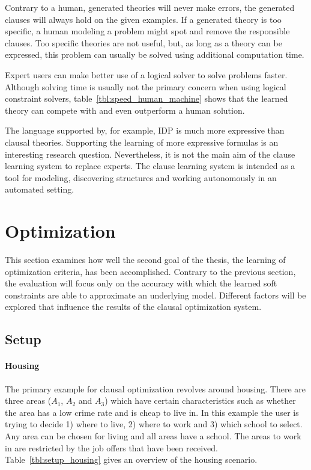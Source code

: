 Contrary to a human, generated theories will never make errors, the generated clauses will always hold on the given examples.
If a generated theory is too specific, a human modeling a problem might spot and remove the responsible clauses.
Too specific theories are not useful, but, as long as a theory can be expressed, this problem can usually be solved using additional computation time.

Expert users can make better use of a logical solver to solve problems faster.
Although solving time is usually not the primary concern when using logical constraint solvers, table~\ref{tbl:speed_human_machine} shows that the learned theory can compete with and even outperform a human solution.

The language supported by, for example, IDP is much more expressive than clausal theories.
Supporting the learning of more expressive formulas is an interesting research question.
Nevertheless, it is not the main aim of the clause learning system to replace experts.
The clause learning system is intended as a tool for modeling, discovering structures and working autonomously in an automated setting.

\section{Optimization}
This section examines how well the second goal of the thesis, the learning of optimization criteria, has been accomplished.
Contrary to the previous section, the evaluation will focus only on the accuracy with which the learned soft constraints are able to approximate an underlying model.
Different factors will be explored that influence the results of the clausal optimization system.

\subsection{Setup}

\paragraph{Housing}
The primary example for clausal optimization revolves around housing.
There are three areas ($A_1$, $A_2$ and $A_3$) which have certain characteristics such as whether the area has a low crime rate and is cheap to live in.
In this example the user is trying to decide 1) where to live, 2) where to work and 3) which school to select.
Any area can be chosen for living and all areas have a school.
The areas to work in are restricted by the job offers that have been received.
Table~\ref{tbl:setup_housing} gives an overview of the housing scenario.

